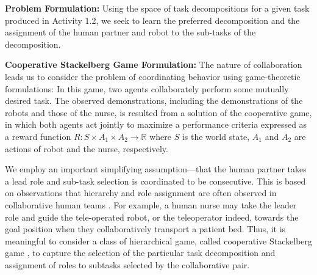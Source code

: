 \documentclass[letterpaper, 11 pt, onecolumn]{article}
\begin{document}

{\bf Problem Formulation:} Using the space of task decompositions for a given task produced in Activity 1.2, we seek to learn the preferred decomposition and the assignment of the human partner and robot to the sub-tasks of the decomposition.  

\noindent
{\bf Cooperative Stackelberg Game Formulation:} 
The nature of collaboration leads us to consider the problem of coordinating behavior using game-theoretic formulations: In this game, two agents collaborately perform some mutually desired task. The observed demonstrations, including the demonstrations of the robots and those of the nurse, is resulted from a solution of the cooperative game, in which both agents act jointly to maximize a performance criteria expressed as a reward function $R: S \times A_1\times A_2 \rightarrow \mathbb{R}$ where $S$ is the world state, $A_1$ and $A_2$ are actions of robot and the nurse, respectively. 

We employ an important simplifying assumption---that the human partner takes a lead role and sub-task selection is coordinated to be consecutive.  This is based on observations that 
hierarchy and role assignment are often observed in collaborative human teams \cite{mortl2012role,colman2014explaining}. For example, a human nurse may take the leader role and guide the tele-operated robot, or the teleoperator indeed,  towards the goal position when they collaboratively transport a patient bed. Thus, it is meaningful to consider a class of hierarchical game, called cooperative Stackelberg game \cite{basar1999dynamic}, to capture the selection of the particular task decomposition and assignment of roles to subtasks selected by the collaborative pair.
\end{document}
